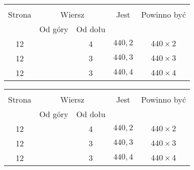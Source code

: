 \documentclass[a4paper,11pt]{article}
\begin{document}
\begin{center}

  \begin{tabular}{|c|c|c|c|c|}
    \hline
    & \multicolumn{2}{c|}{} & & \\
    Strona & \multicolumn{2}{c|}{Wiersz} & Jest
                              & Powinno być \\ \cline{2-3}
    & Od góry & Od dołu & & \\
    \hline
    12  & &  4 & $440,\! 2$ & $440 \times 2$ \\
    12  & &  3 & $440,\! 3$ & $440 \times 3$ \\
    12  & &  3 & $440,\! 4$ & $440 \times 4$ \\
    \hline
  \end{tabular}

\end{center}



\vspace{\spaceTwo}

















\begin{center}

  \begin{tabular}{|c|c|c|c|c|}
    \hline
    & \multicolumn{2}{c|}{} & & \\
    Strona & \multicolumn{2}{c|}{Wiersz} & Jest
                              & Powinno być \\ \cline{2-3}
    & Od góry & Od dołu & & \\
    \hline
    12  & &  4 & $440,\! 2$ & $440 \times 2$ \\
    12  & &  3 & $440,\! 3$ & $440 \times 3$ \\
    12  & &  3 & $440,\! 4$ & $440 \times 4$ \\
    \hline
  \end{tabular}

\end{center}
\end{document}
